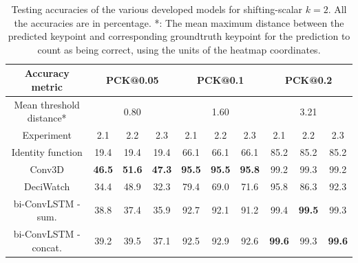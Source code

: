 \documentclass[./main.tex]{subfiles}
\begin{document}
\begin{table}[htbp]
    \begin{tabular}{c||ccc|ccc|ccc}
        \hline
        Accuracy metric & \multicolumn{3}{c}{PCK@0.05} & \multicolumn{3}{c}{PCK@0.1} & \multicolumn{3}{c}{PCK@0.2} \\
        \hline
        Mean threshold distance* & \multicolumn{3}{c}{0.80} & \multicolumn{3}{c}{1.60} & \multicolumn{3}{c}{3.21} \\
        \hline
        Experiment & 2.1 & 2.2 & 2.3 & 2.1 & 2.2 & 2.3 & 2.1 & 2.2 & 2.3 \\
        \hline
        \hline
        Identity function & 19.4 & 19.4 & 19.4 & 66.1 & 66.1 & 66.1 & 85.2 & 85.2 & 85.2 \\
        Conv3D & \textbf{46.5} & \textbf{51.6} & \textbf{47.3} & \textbf{95.5} & \textbf{95.5} & \textbf{95.8} & 99.2 & 99.3 & 99.2 \\
        DeciWatch & 34.4 & 48.9 & 32.3 & 79.4 & 69.0 & 71.6 & 95.8 & 86.3 & 92.3 \\
        bi-ConvLSTM - sum. & 38.8 & 37.4 & 35.9 & 92.7 & 92.1 & 91.2 & 99.4 & \textbf{99.5} & 99.3 \\
        bi-ConvLSTM - concat. & 39.2 & 39.5 & 37.1 & 92.5 & 92.9 & 92.6 & \textbf{99.6} & 99.3 & \textbf{99.6} \\
        \hline
    \end{tabular}
    \caption{Testing accuracies of the various developed models for shifting-scalar $k = 2$. All the accuracies are in percentage. *: The mean maximum distance between the predicted keypoint and corresponding groundtruth keypoint for the prediction to count as being correct, using the units of the heatmap coordinates.}
    \label{tab:finetune_test_accs_2}
\end{table}
\end{document}
